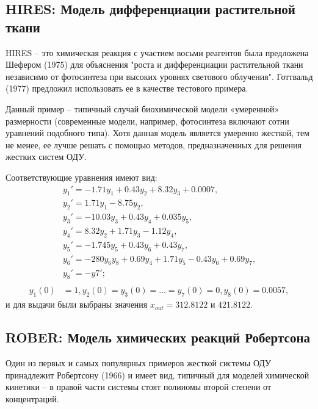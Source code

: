 \documentclass[a4paper,14pt]{extreport}
\begin{document}
  \subsection{HIRES: Модель дифференциации растительной ткани}
  \label{ss:hires}
  HIRES -- это химическая реакция с участием восьми реагентов была предложена Шефером (1975) для объяснения "роста и дифференциации растительной ткани независимо от фотосинтеза при высоких уровнях светового облучения". Готтвальд (1977) предложил использовать ее в качестве тестового примера\cite{hairer}.
  
 Данный пример -- типичный случай биохимической модели «умеренной» размерности (современные модели, например, фотосинтеза включают сотни уравнений подобного типа). Хотя данная модель является умеренно жесткой, тем не менее, ее лучше решать с помощью методов, предназначенных для решения жестких систем ОДУ\cite{holodov}.
   
   Соответствующие уравнения имеют вид:
    \begin{equation}
	\begin{aligned}
	\label{hires}
	&y_1' = -1.71 y_1+0.43 y_2+8.32 y_3+0.0007,\\
	&y_2' = 1.71y_1 - 8.75y_2,\\
	&y_3' = -10.03y_3+0.43y_4+0.035y_5,\\
	&y_4' = 8.32y_2 + 1.71y_3-1.12y_4,\\
	&y_5' = -1.745y_5 + 0.43y_6 + 0.43y_7,\\
	&y_6' = -280y_6y_8+0.69y_4+1.71y_5-0.43y_6+0.69y_7,\\
	&y_8'=-y7';\\
	&\\
	y_1(0)&=1, y_2(0) = y_3(0) = ...=y_7(0) = 0, y_8(0) = 0.0057,
	\end{aligned}
	\end{equation}
и для выдачи были выбраны значения $x_{out}=312.8122$ и $421.8122$.

\subsection{ROBER: Модель химических реакций Робертсона}
  \label{ss:rober}
  Один из первых и самых популярных примеров жесткой системы ОДУ принадлежит Робертсону (1966) и имеет вид, типичный для моделей химической кинетики -- в правой части системы стоят полиномы второй степени от концентраций.
  
\end{document}
